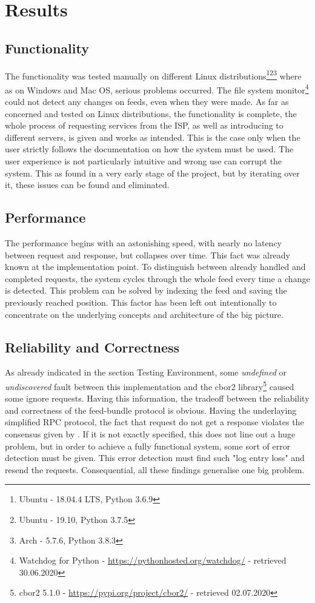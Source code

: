 \section{Results}
\subsection{Functionality}
The functionality was tested manually on different Linux distributions\footnote{Ubuntu - 18.04.4 LTS, Python 3.6.9}\footnote{Ubuntu - 19.10, Python 3.7.5}\footnote{Arch - 5.7.6, Python 3.8.3} where as on Windows and Mac OS, serious problems occurred. The file system monitor\footnote{Watchdog for Python - \url{https://pythonhosted.org/watchdog/} - retrieved 30.06.2020} could not detect any changes on feeds, even when they were made. As far as concerned and tested on Linux distributions, the functionality is complete, the whole process of requesting services from the ISP, as well as introducing to different servers, is given and works as intended. This is the case only when the user strictly follows the documentation on how the system must be used. The user experience is not particularly intuitive and wrong use can corrupt the system. This as found in a very early stage of the project, but by iterating over it, these issues can be found and eliminated.
\subsection{Performance}
The performance begins with an astonishing speed, with nearly no latency between request and response, but collapses over time. This fact was already known at the implementation point. To distinguish between already handled and completed requests, the system cycles through the whole feed every time a change is detected. This problem can be solved by indexing the feed and saving the previously reached position. This factor has been left out intentionally to concentrate on the underlying concepts and architecture of the big 
picture.
\subsection{Reliability and Correctness}
As already indicated in the section Testing Environment, some \textit{undefined} or \textit{undiscovered} fault between this implementation and the cbor2 library\footnote{cbor2 5.1.0 - \url{https://pypi.org/project/cbor2/} - retrieved 02.07.2020} caused some ignore requests. Having this information, the tradeoff between the reliability and correctness of the feed-bundle protocol is obvious. Having the underlaying simplified RPC protocol, the fact that request do not get a response violates the consensus given by \citet{birrell1984implementing}. If it is not exactly specified, this does not line out a huge problem, but in order to achieve a fully functional system, some sort of error detection must be given. This error detection must find such "log entry loss" and resend the requests. Consequential, all these findings generalise one big problem.

